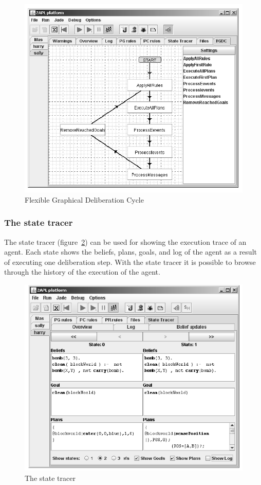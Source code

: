 \documentclass[a4paper]{article}
\begin{document}
\begin{figure}[htp]
\centering
\includegraphics[keepaspectratio,scale=0.7]{fig/fgdc.png}
\caption{Flexible Graphical Deliberation Cycle}
\label{fig:fgdc}
\end{figure}

\subsubsection{The state tracer}

The state tracer (figure~\ref{fig:state}) can be used for showing the execution trace of an agent. Each state shows the beliefs, plans, goals, and log of the agent as a result of executing one deliberation step. With the state tracer it is possible to browse through the history of the execution of the agent.

\begin{figure}[htp]
\centering
\includegraphics[keepaspectratio,scale=0.7]{fig/state.png}
\caption{The state tracer}
\label{fig:state}
\end{figure}
\end{document}
